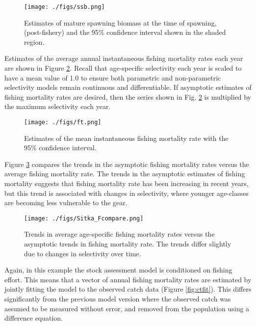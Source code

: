 \documentclass[12pt,letterpaper]{article}
\begin{document}
  
  \begin{figure}[tb]
    \centering
    \texttt{[image: ./figs/ssb.png]}
    \caption{Estimates of mature spawning biomass at the time of spawning, (post-fishery) and the 95\% confidence interval shown in the shaded region.}
    \label{fig:ssb}
  \end{figure}

  Estimates of the average annual instantaneous fishing mortality rates each year are shown in Figure \ref{fig:ft}.  Recall that age-specific selectivity each year is scaled to have a mean value of 1.0 to ensure both parametric and non-parametric selectivity models remain continuous and differentiable.  If asymptotic estimates of fishing mortality rates are desired, then the series shown in Fig. \ref{fig:ft} is multiplied by the maximum selectivity each year.  

  \begin{figure}[tb]
    \centering
    \texttt{[image: ./figs/ft.png]}
    \caption{Estimates of the mean instantaneous fishing mortality rate with the 95\% confidence interval.}
    \label{fig:ft}
  \end{figure}

  Figure \ref{fig:Fcompare} compares the trends in the asymptotic fishing mortality rates versus the average fishing mortality rate.  The trends in the asymptotic estimates of fishing mortality suggests that fishing mortality rate has been increasing in recent years, but this trend is associated with changes in selectivity, where younger age-classes are becoming less vulnerable to the gear.  

  \begin{figure}[tb]
    \centering
    \texttt{[image: ./figs/Sitka\_Fcompare.png]}
    \caption{Trends in average age-specific fishing mortality rates versus the asymptotic trends in fishing mortality rate. The trends differ slightly due to changes in selectivity over time.}
    \label{fig:Fcompare}
  \end{figure}

  Again, in this example the stock assessment model is conditioned on fishing effort. This means that a vector of annual fishing mortality rates are estimated by jointly fitting the model to the observed catch data (Figure \ref{fig:ctfit}).  This differs significantly from the previous model version where the observed catch was assumed to be measured without error, and removed from the population using a difference equation. 
\end{document}
